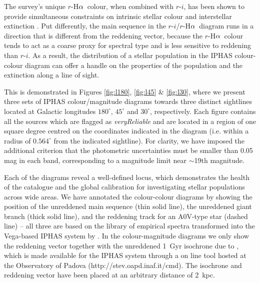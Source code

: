 \documentclass[useAMS,usenatbib]{mn2e}
\def\ha{\mbox{H$\rm \alpha$}}
\begin{document}
The survey's unique $r$-\ha\ colour,
when combined with $r$-$i$,
has been shown to provide simultaneous constraints 
on intrinsic stellar colour and interstellar extinction \citep{Drew2008}. 
Put differently, the main sequence in the $r$-$i$/$r$-\ha\ diagram
runs in a direction that is different from the reddening vector,
because the $r$-\ha\ colour tends to act
as a coarse proxy for spectral type
and is less sensitive to reddening than $r$-$i$.
As a result, the distribution of a stellar population
in the IPHAS colour-colour diagram
can offer a handle on the properties of the population
and the extinction along a line of sight.

This is demonstrated 
in Figures \ref{fig:l180}, \ref{fig:l45} \& \ref{fig:l30},
where we present three sets of IPHAS colour/magnitude diagrams
towards three distinct sightlines
located at Galactic longitudes 
$180^\circ$, $45^\circ$ and $30^\circ$, respectively.
Each figure contains all the sources
which are flagged as \emph{veryReliable}
and are located in a region of one square degree 
centred on the coordinates indicated in the diagram
(i.e. within a radius of $0.564^\circ$ from the indicated sightline).
For clarity, we have imposed the additional criterion
that the photometric uncertainties
must be smaller than 0.05 mag in each band,
corresponding to a magnitude limit near $\sim$19th magnitude.

Each of the diagrams reveal a well-defined locus,
which demonstrates the health of the catalogue and the global calibration
for investigating stellar populations across wide areas.
We have annotated the colour-colour diagrams
by showing the position 
of the unreddened main sequence (thin solid line),
the unreddened giant branch (thick solid line),
and the reddening track for an A0V-type star (dashed line)
-- all three are based on the \cite{Pickles1998} library 
of empirical spectra
transformed into the Vega-based IPHAS system by \cite{Drew2005}.
In the colour-magnitude diagrams we only show the reddening vector
together with the unreddened 1~Gyr isochrone due to \cite{Bressan2012},
which is made available for the IPHAS system through a
on line tool hosted at the Observatory of Padova
(http://stev.oapd.inaf.it/cmd).
The isochrone and reddening vector have been placed
at an arbitrary distance of 2~kpc.
\end{document}
